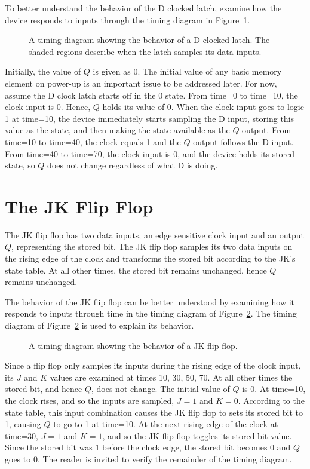 To better understand the behavior of the D clocked latch,
examine how the device responds to inputs through
the timing diagram in Figure~\ref{fig:sequentialCirDCL}.

\begin{figure}[ht]
\caption{A timing diagram showing the behavior of a D clocked latch.
The shaded regions describe when the latch samples its data inputs.}
\label{fig:sequentialCirDCL}
\end{figure}

Initially, the value of $Q$ is given as 0.  The initial value
of any basic memory element on power-up is an important issue
to be addressed later. For now, assume the
D clock latch starts off in the 0 state.  From time=0 to time=10, the
clock input is 0. Hence, $Q$ holds its value of 0.  When the
clock input goes to logic 1 at time=10, the device immediately
starts sampling the D input, storing this value as the state,
and then making the state available as the $Q$ output.  From
time=10 to time=40, the clock equals 1 and the $Q$ output follows
the D input.  From time=40 to time=70, the clock input is 0, and
the device holds its stored state, so $Q$ does not change
regardless of what D is doing.

\section{The JK Flip Flop}
The JK flip flop has two data inputs, an edge sensitive clock
input and an output $Q$, representing the stored bit.  The
JK flip flop samples its two data inputs on the rising edge
of the clock and transforms the stored bit according to the
JK's state table.  At all other times, the stored bit remains
unchanged, hence $Q$ remains unchanged.

The behavior of the JK flip flop can be better understood
by examining how it responds to inputs through time in the
timing diagram of Figure~\ref{fig:sequentialCirJKFF}.
The timing diagram of Figure~\ref{fig:sequentialCirJKFF}
is used to explain its behavior.
\begin{figure}[ht]
\caption{A timing diagram showing the behavior of a JK flip flop.}
\label{fig:sequentialCirJKFF}
\end{figure}

Since a flip flop only samples its inputs during the rising edge
of the clock input, its $J$ and $K$ values are examined
at times 10, 30, 50, 70. At all other times the stored bit, and
hence $Q$, does not change. The initial value of $Q$ is 0.  At
time=10, the clock rises, and so the inputs are sampled, $J=1$ and
$K=0$.  According to the state table, this input combination causes
the JK flip flop to sets its stored bit to 1, causing $Q$ to go
to 1 at time=10.  At the next rising edge of the clock at time=30,
$J=1$ and $K=1$, and so the JK flip flop toggles its stored bit value.
Since the stored bit was 1 before the clock edge, the stored bit
becomes 0 and $Q$ goes to 0.  The reader is invited to verify the
remainder of the timing diagram.

